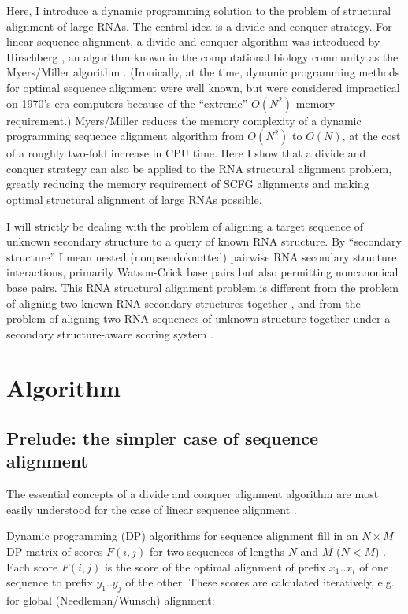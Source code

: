 \documentclass[11pt]{article}
\begin{document}
Here, I introduce a dynamic programming solution to the problem of
structural alignment of large RNAs. The central idea is a divide and
conquer strategy. For linear sequence alignment, a divide and conquer
algorithm was introduced by Hirschberg \cite{Hirschberg75}, an
algorithm known in the computational biology community as the
Myers/Miller algorithm \cite{MyM-88a}. (Ironically, at the time,
dynamic programming methods for optimal sequence alignment were well
known, but were considered impractical on 1970's era computers because
of the ``extreme'' $O(N^2)$ memory requirement.) Myers/Miller reduces
the memory complexity of a dynamic programming sequence alignment
algorithm from $O(N^2)$ to $O(N)$, at the cost of a roughly two-fold
increase in CPU time. Here I show that a divide and conquer strategy
can also be applied to the RNA structural alignment problem, greatly
reducing the memory requirement of SCFG alignments and making optimal
structural alignment of large RNAs possible.

I will strictly be dealing with the problem of aligning a target
sequence of unknown secondary structure to a query of known RNA
structure. By ``secondary structure'' I mean nested (nonpseudoknotted)
pairwise RNA secondary structure interactions, primarily Watson-Crick
base pairs but also permitting noncanonical base pairs. This RNA
structural alignment problem is different from the problem of aligning
two known RNA secondary structures together \cite{Shapiro90}, and from
the problem of aligning two RNA sequences of unknown structure
together under a secondary structure-aware scoring system
\cite{Sankoff85,KnudsenHein99,Gorodkin01,HolmesRubin02,MathewsTurner02}.

\section{Algorithm}

\subsection{Prelude: the simpler case of sequence alignment}

The essential concepts of a divide and conquer alignment algorithm are
most easily understood for the case of linear sequence alignment
\cite{Hirschberg75,MyM-88a}.

Dynamic programming (DP) algorithms for sequence alignment fill in an
$N \times M$ DP matrix of scores $F(i,j)$ for two sequences of lengths
$N$ and $M$ ($N < M$)  \cite{Needleman70,Smith81}. Each score
$F(i,j)$ is the score of the optimal alignment of prefix $x_1..x_i$ of
one sequence to prefix $y_1..y_j$ of the other. These scores are
calculated iteratively, e.g.  for global (Needleman/Wunsch) alignment:
\end{document}
